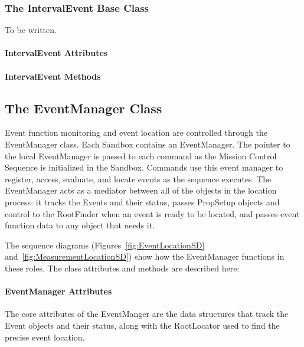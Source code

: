 \subsubsection{The IntervalEvent Base Class}

To be written.

\paragraph{IntervalEvent Attributes}

\paragraph{IntervalEvent Methods}

\subsection{The EventManager Class}

Event function monitoring and event location are controlled through the EventManager class.  Each Sandbox contains an EventManager.  The pointer to the local EventManager is passed to each command as the Mission Control Sequence is initialized in the Sandbox.  Commands use this event manager to register, access, evaluate, and locate events as the sequence executes.  The EventManager acts as a mediator between all of the objects in the location process: it tracks the Events and their status, passes PropSetup objects and control to the RootFinder when an event is ready to be located, and passes event function data to any object that needs it.

The sequence diagrams (Figures~\ref{fig:EventLocationSD} and~\ref{fig:MeasurementLocationSD}) show how the EventManager functions in these roles.  The class attributes and methods are described here:

\paragraph{EventManager Attributes}  The core attributes of the EventManger are the data structures that track the Event objects and their status, along with the RootLocator used to find the precise event location.

